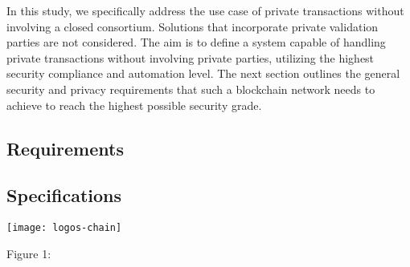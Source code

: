 In this study, we specifically address the use case of private transactions without involving a closed consortium. Solutions that incorporate private validation parties are not considered. The aim is to define a system capable of handling private transactions without involving private parties, utilizing the highest security compliance and automation level.
The next section outlines the general security and privacy requirements that such a blockchain network needs to achieve to reach the highest possible security grade. 

\subsection{Requirements}


\subsection{Specifications}

\begin{center}
	\texttt{[image: logos-chain]}
\end{center}
\begin{center}
	Figure 1: 
\end{center}